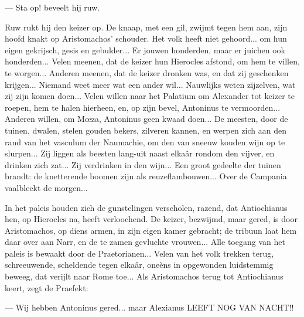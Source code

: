 \documentclass[a4paper, 12pt, oneside, dutch]{article}
\begin{document}
--- Sta op! beveelt hij ruw.

Ruw rukt hij den keizer op. De knaap, met een gil, zwijmt tegen hem aan, zijn hoofd knakt op Aristomachos' schouder. Het volk heeft niet gehoord... om hun eigen gekrijsch, gesis en gebulder... Er jouwen honderden, maar er juichen ook honderden... Velen meenen, dat de keizer hun Hierocles afstond, om hem te villen, te worgen... Anderen meenen, dat de keizer dronken was, en dat zij geschenken krijgen... Niemand weet meer wat een ander wil... Nauwlijks weten zijzelven, wat zij zijn komen doen... Velen willen naar het Palatium om Alexander tot keizer te roepen, hem te halen hierheen, en, op zijn bevel, Antoninus te vermoorden... Anderen willen, om Mœza, Antoninus geen kwaad doen... De meesten, door de tuinen, dwalen, stelen gouden bekers, zilveren kannen, en werpen zich aan den rand van het vasculum der Naumachie, om den van sneeuw kouden wijn op te slurpen... Zij liggen als beesten lang-uit naast elkaâr rondom den vijver, en drinken zich zat... Zij verdrinken in den wijn... Een groot gedeelte der tuinen brandt: de knetterende boomen zijn als reuzeflambouwen... Over de Campania vaalbleekt de morgen...

In het paleis houden zich de gunstelingen verscholen, razend, dat Antiochianus hen, op Hierocles na, heeft verloochend. De keizer, bezwijmd, maar gered, is door Aristomachos, op diens armen, in zijn eigen kamer gebracht; de tribuun laat hem daar over aan Narr, en de te zamen gevluchte vrouwen... Alle toegang van het paleis is bewaakt door de Praetorianen... Velen van het volk trekken terug, schreeuwende, scheldende tegen elkaâr, oneèns in opgewonden luidstemmig beweeg, dat verijlt naar Rome toe... Als Aristomachos terug tot Antiochianus keert, zegt de Praefekt:

--- Wij hebben Antoninus gered... maar Alexianus LEEFT NOG VAN NACHT!!

\subsection{}
\end{document}
